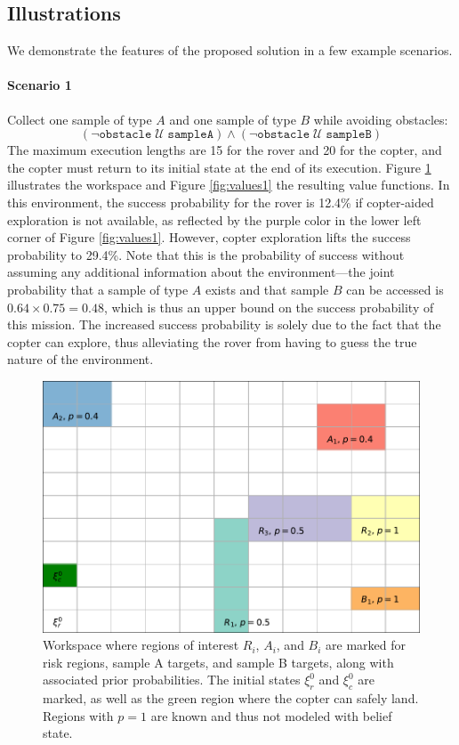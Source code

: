 \documentclass[conference]{IEEEtran}
\begin{document}
\subsection{Illustrations}

We demonstrate the features of the proposed solution in a few example scenarios.

\paragraph{Scenario 1} Collect one sample of type $A$ and one sample of type $B$ while avoiding obstacles:
\begin{equation*}
  \left( \lnot \texttt{obstacle} \; \mathcal U \; \texttt{sampleA} \right) \land \left( \lnot \texttt{obstacle} \; \mathcal U \; \texttt{sampleB} \right)
\end{equation*}
The maximum execution lengths are 15 for the rover and 20 for the copter, and the copter must return to its initial state at the end of its execution. Figure \ref{fig:workspace1} illustrates the workspace and Figure \ref{fig:values1} the resulting value functions. In this environment, the success probability for the rover is 12.4\% if copter-aided exploration is not available, as reflected by the purple color in the lower left corner of Figure \ref{fig:values1}. However, copter exploration lifts the success probability to 29.4\%. Note that this is the probability of success without assuming any additional information about the environment---the joint probability that a sample of type $A$ exists and that sample $B$ can be accessed is $0.64 \times 0.75 = 0.48$, which is thus an upper bound on the success probability of this mission. The increased success probability is solely due to the fact that the copter can explore, thus alleviating the rover from having to guess the true nature of the environment.

\begin{figure}
  \begin{center}
    \includegraphics[width=0.6\columnwidth]{2figs/exp1-map.pdf}
  \end{center}
  \caption{Workspace where regions of interest $R_i$, $A_i$, and $B_i$ are marked for risk regions, sample A targets, and sample B targets, along with associated prior probabilities. The initial states $\xi_r^0$ and $\xi_c^0$ are marked, as well as the green region where the copter can safely land. Regions with $p=1$ are known and thus not modeled with belief state.}
  \label{fig:workspace1}
\end{figure}
\end{document}
